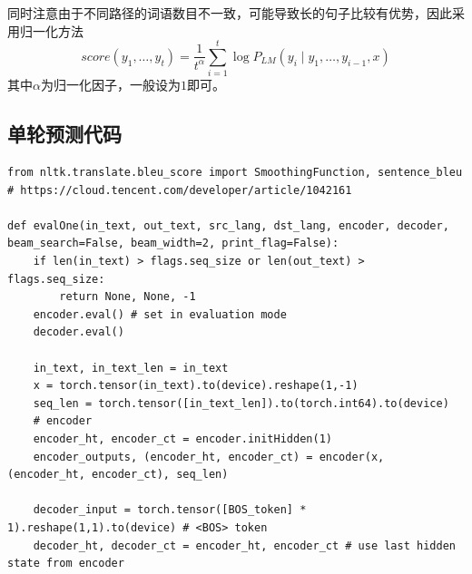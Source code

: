 \documentclass[logo,reportComp]{thesis}
\begin{document}
同时注意由于不同路径的词语数目不一致，可能导致长的句子比较有优势，因此采用归一化方法
\[score(y_1,\ldots,y_t)=\frac{1}{t^\alpha}\sum_{i=1}^t\log P_{LM}(y_i\mid y_1,\ldots,y_{i-1},x)\]
其中$\alpha$为归一化因子，一般设为$1$即可。

\subsection{单轮预测代码}
\begin{lstlisting}
from nltk.translate.bleu_score import SmoothingFunction, sentence_bleu
# https://cloud.tencent.com/developer/article/1042161

def evalOne(in_text, out_text, src_lang, dst_lang, encoder, decoder, beam_search=False, beam_width=2, print_flag=False):
    if len(in_text) > flags.seq_size or len(out_text) > flags.seq_size:
        return None, None, -1
    encoder.eval() # set in evaluation mode
    decoder.eval()

    in_text, in_text_len = in_text
    x = torch.tensor(in_text).to(device).reshape(1,-1)
    seq_len = torch.tensor([in_text_len]).to(torch.int64).to(device)
    # encoder
    encoder_ht, encoder_ct = encoder.initHidden(1)
    encoder_outputs, (encoder_ht, encoder_ct) = encoder(x, (encoder_ht, encoder_ct), seq_len)

    decoder_input = torch.tensor([BOS_token] * 1).reshape(1,1).to(device) # <BOS> token
    decoder_ht, decoder_ct = encoder_ht, encoder_ct # use last hidden state from encoder


\end{lstlisting}
\end{document}
